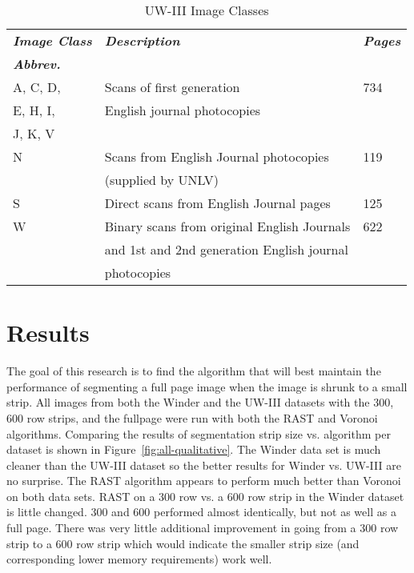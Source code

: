 \documentclass[conference]{IEEEtran}
\begin{document}
\begin{table}
\caption{UW-III Image Classes}
\label{table:UW-III Image Classes}
\begin{tabular}{|l|l|l|}
\hline
\textit{\textbf{Image Class}} & \textit{\textbf{Description}} & \textit{\textbf{Pages}}  \\ 
\textit{\textbf{Abbrev.}} & & \\ 
\hline
    \hline
    A, C, D,   & Scans of first generation & 734 \\
    E, H, I,   & English journal photocopies & \\ 
    J, K, V    &  & \\ 
    \hline
    N & Scans from English Journal photocopies & 119 \\ 
      & (supplied by UNLV) & \\ 
    \hline
    S & Direct scans from English Journal pages & 125 \\ 
    \hline
    W & Binary scans from original English Journals & 622 \\
      & and 1st and 2nd generation English journal & \\
      & photocopies  & \\ 
    \hline
\end{tabular}
\end{table}

\section{Results}

The goal of this research is to find the algorithm that will best maintain the
performance of segmenting a full page image when the image is shrunk to a small
strip.  All images from both the Winder and the UW-III datasets with 
the 300, 600 row strips, and the fullpage were run with both the RAST and
Voronoi algorithms. 
Comparing the results of segmentation strip size vs. algorithm per dataset
is shown in Figure~\ref{fig:all-qualitative}. 
The Winder data set is much cleaner than the UW-III dataset 
so the better results for Winder vs. UW-III are no surprise. 
The RAST algorithm appears to perform much better than Voronoi on both data sets.
RAST on a 300 row vs. a 600 row strip in the Winder dataset is little changed.
300 and 600 performed almost identically, but not as well as a full page. There
was very little additional improvement in going from a 300 row strip to a 600
row strip which would indicate the smaller strip size (and corresponding lower
memory requirements) work well.
\end{document}
